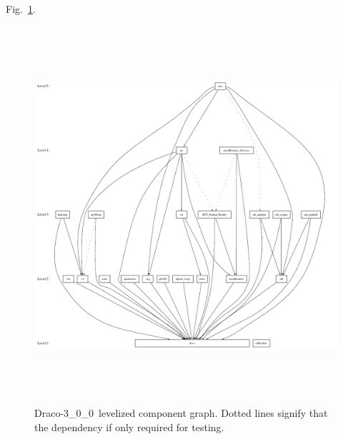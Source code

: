 \documentclass[note]{ResearchNote_pdf}
\newcommand{\draco}{Draco}
\newcommand{\dracor}{\draco-3\_0\_0}
\begin{document}
Fig.~\ref{fig:level}.
\begin{figure}
  \label{fig:level}
  \centerline{
    \includegraphics[height=5.5in]{level-3_0_0}}
  \caption{\dracor\ levelized component graph.  Dotted lines signify
    that the dependency if only required for testing.}
\end{figure}
\end{document}
